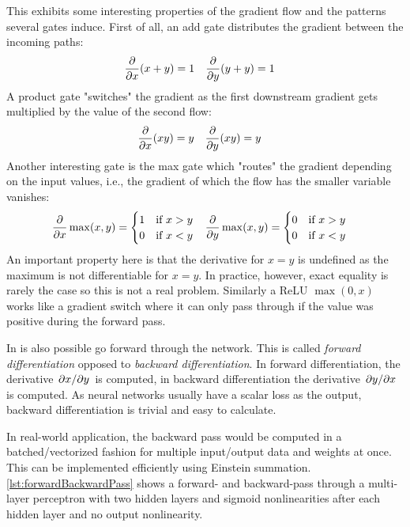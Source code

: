 	This exhibits some interesting properties of the gradient flow and the patterns several gates induce. First of all, an add gate distributes the gradient between the incoming paths:
	\begin{align}
		\pdv{x} (x + y) & = 1 &
		\pdv{y} (y + y) & = 1
	\end{align}
	A product gate "switches" the gradient as the first downstream gradient gets multiplied by the value of the second flow:
	\begin{align}
		\pdv{x} (xy) & = y &
		\pdv{y} (xy) & = y
	\end{align}
	Another interesting gate is the max gate which "routes" the gradient depending on the input values, i.e., the gradient of which the flow has the smaller variable vanishes:
	\begin{align}
		\pdv{x} \max(x, y)      & =
		\begin{cases}
			1 & \text{if } x > y \\
			0 & \text{if } x < y
		\end{cases} &
		\pdv{y} \max(x, y)      & =
		\begin{cases}
			0 & \text{if } x > y \\
			0 & \text{if } x < y
		\end{cases}
	\end{align}
	An important property here is that the derivative for \(x = y\) is undefined as the maximum is not differentiable for \(x = y\). In practice, however, exact equality is rarely the case so this is not a real problem. Similarly a ReLU \( \max(0, x) \) works like a gradient switch where it can only pass through if the value was positive during the forward pass.

	In is also possible go forward through the network. This is called \emph{forward differentiation} opposed to \emph{backward differentiation}. In forward differentiation, the derivative \( \pdv*{x}{y} \) is computed, in backward differentiation the derivative \( \pdv*{y}{x} \) is computed. As neural networks usually have a scalar loss as the output, backward differentiation is trivial and easy to calculate.

	In real-world application, the backward pass would be computed in a batched/vectorized fashion for multiple input/output data and weights at once. This can be implemented efficiently using Einstein summation. \autoref{lst:forwardBackwardPass} shows a forward- and backward-pass through a multi-layer perceptron with two hidden layers and sigmoid nonlinearities after each hidden layer and no output nonlinearity.

